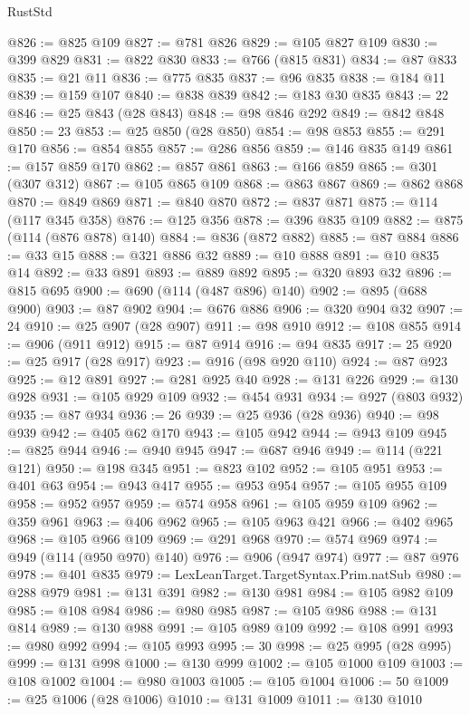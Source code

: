 \begin{lexlean}{RustStd}
\begin{coremodule}
@826 := @825 @109
@827 := @781 @826
@829 := @105 @827 @109
@830 := @399 @829
@831 := @822 @830
@833 := @766 (@815 @831)
@834 := @87 @833
@835 := @21 @11
@836 := @775 @835
@837 := @96 @835
@838 := @184 @11
@839 := @159 @107
@840 := @838 @839
@842 := @183 @30 @835
@843 := 22
@846 := @25 @843 (@28 @843)
@848 := @98 @846 @292
@849 := @842 @848
@850 := 23
@853 := @25 @850 (@28 @850)
@854 := @98 @853
@855 := @291 @170
@856 := @854 @855
@857 := @286 @856
@859 := @146 @835 @149
@861 := @157 @859 @170
@862 := @857 @861
@863 := @166 @859
@865 := @301 (@307 @312)
@867 := @105 @865 @109
@868 := @863 @867
@869 := @862 @868
@870 := @849 @869
@871 := @840 @870
@872 := @837 @871
@875 := @114 (@117 @345 @358)
@876 := @125 @356
@878 := @396 @835 @109
@882 := @875 (@114 (@876 @878) @140)
@884 := @836 (@872 @882)
@885 := @87 @884
@886 := @33 @15
@888 := @321 @886 @32
@889 := @10 @888
@891 := @10 @835 @14
@892 := @33 @891
@893 := @889 @892
@895 := @320 @893 @32
@896 := @815 @695
@900 := @690 (@114 (@487 @896) @140)
@902 := @895 (@688 @900)
@903 := @87 @902
@904 := @676 @886
@906 := @320 @904 @32
@907 := 24
@910 := @25 @907 (@28 @907)
@911 := @98 @910
@912 := @108 @855
@914 := @906 (@911 @912)
@915 := @87 @914
@916 := @94 @835
@917 := 25
@920 := @25 @917 (@28 @917)
@923 := @916 (@98 @920 @110)
@924 := @87 @923
@925 := @12 @891
@927 := @281 @925 @40
@928 := @131 @226
@929 := @130 @928
@931 := @105 @929 @109
@932 := @454 @931
@934 := @927 (@803 @932)
@935 := @87 @934
@936 := 26
@939 := @25 @936 (@28 @936)
@940 := @98 @939
@942 := @405 @62 @170
@943 := @105 @942
@944 := @943 @109
@945 := @825 @944
@946 := @940 @945
@947 := @687 @946
@949 := @114 (@221 @121)
@950 := @198 @345
@951 := @823 @102
@952 := @105 @951
@953 := @401 @63
@954 := @943 @417
@955 := @953 @954
@957 := @105 @955 @109
@958 := @952 @957
@959 := @574 @958
@961 := @105 @959 @109
@962 := @359 @961
@963 := @406 @962
@965 := @105 @963 @421
@966 := @402 @965
@968 := @105 @966 @109
@969 := @291 @968
@970 := @574 @969
@974 := @949 (@114 (@950 @970) @140)
@976 := @906 (@947 @974)
@977 := @87 @976
@978 := @401 @835
@979 := LexLeanTarget.TargetSyntax.Prim.natSub
@980 := @288 @979
@981 := @131 @391
@982 := @130 @981
@984 := @105 @982 @109
@985 := @108 @984
@986 := @980 @985
@987 := @105 @986
@988 := @131 @814
@989 := @130 @988
@991 := @105 @989 @109
@992 := @108 @991
@993 := @980 @992
@994 := @105 @993
@995 := 30
@998 := @25 @995 (@28 @995)
@999 := @131 @998
@1000 := @130 @999
@1002 := @105 @1000 @109
@1003 := @108 @1002
@1004 := @980 @1003
@1005 := @105 @1004
@1006 := 50
@1009 := @25 @1006 (@28 @1006)
@1010 := @131 @1009
@1011 := @130 @1010

\end{coremodule}
\end{lexlean}
